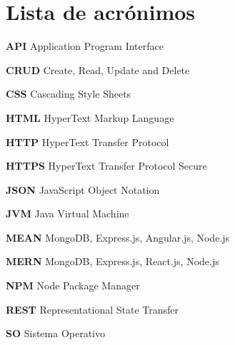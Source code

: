 \section*{Lista de acrónimos}

\noindent \textbf{API} Application Program Interface \newline \smallskip 

\noindent \textbf{CRUD} Create, Read, Update and Delete \newline \smallskip

\noindent \textbf{CSS} Cascading Style Sheets \newline \smallskip

\noindent \textbf{HTML} HyperText Markup Language \newline \smallskip

\noindent \textbf{HTTP} HyperText Transfer Protocol \newline \smallskip

\noindent \textbf{HTTPS} HyperText Transfer Protocol Secure \newline \smallskip

\noindent \textbf{JSON} JavaScript Object Notation \newline \smallskip

\noindent \textbf{JVM} Java Virtual Machine \newline \smallskip

\noindent \textbf{MEAN} MongoDB, Express.js, Angular.js, Node.js \newline \smallskip 

\noindent \textbf{MERN} MongoDB, Express.js, React.js, Node.js \newline \smallskip

\noindent \textbf{NPM} Node Package Manager \newline \smallskip

\noindent \textbf{REST} Representational State Transfer \newline \smallskip

\noindent \textbf{SO} Sistema Operativo \newline \smallskip
